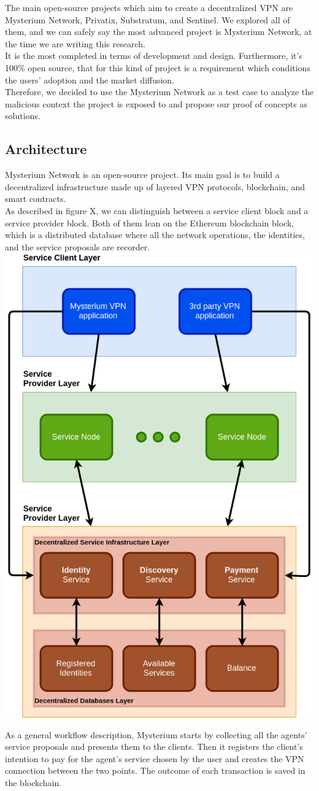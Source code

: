 \documentclass[12pt]{article}
\begin{document}
	The main open-source projects which aim to create a decentralized VPN are Mysterium Network, Privatix, Substratum, and Sentinel. We explored all of them, and we can safely say the most advanced project is Mysterium Network, at the time we are writing this research.\\It is the most completed in terms of development and design. Furthermore, it's 100\% open source, that for this kind of project is a requirement which conditions the users' adoption and the market diffusion.\\
	Therefore, we decided to use the Mysterium Network as a test case to analyze the malicious context the project is exposed to and propose our proof of concepts as solutions.
	
	\subsection{Architecture}
	Mysterium Network is an open-source project. Its main goal is to build a decentralized infrastructure made up of layered VPN protocols, blockchain, and smart contracts.\\
	As described in figure X, we can distinguish between a service client block and a service provider block. Both of them lean on the Ethereum blockchain block, which is a distributed database where all the network operations, the identities, and the service proposals are recorder.\\
	\bigbreak
	\includegraphics[width=0.5\linewidth]{images/mysterium_architecture.png}
	\bigbreak
		
	As a general workflow description, Mysterium starts by collecting all the agents' service proposals and presents them to the clients. Then it registers the client's intention to pay for the agent's service chosen by the user and creates the VPN connection between the two points. The outcome of each transaction is saved in the blockchain.\\
	
\end{document}
